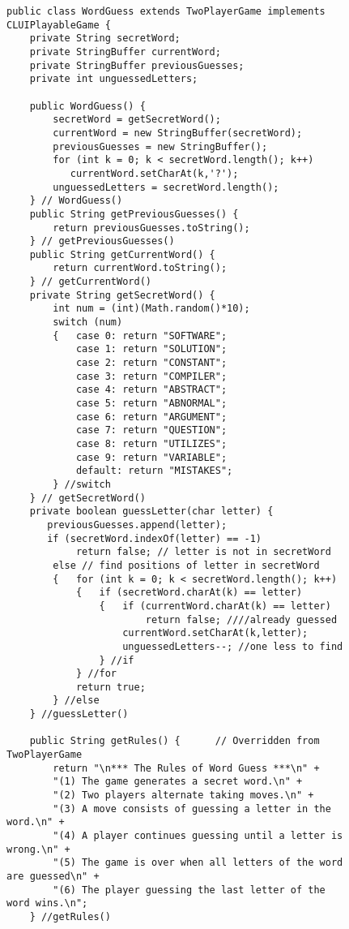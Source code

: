 \begin{figure}[h!!]
\jjjprogstart
\begin{jjjlisting}
\begin{lstlisting}[basicstyle=\scriptsize]
public class WordGuess extends TwoPlayerGame implements CLUIPlayableGame {
    private String secretWord;
    private StringBuffer currentWord;
    private StringBuffer previousGuesses;
    private int unguessedLetters;

    public WordGuess() {   
        secretWord = getSecretWord();
        currentWord = new StringBuffer(secretWord);
        previousGuesses = new StringBuffer();
        for (int k = 0; k < secretWord.length(); k++)
           currentWord.setCharAt(k,'?');
        unguessedLetters = secretWord.length();
    } // WordGuess()
    public String getPreviousGuesses() {
        return previousGuesses.toString();
    } // getPreviousGuesses()
    public String getCurrentWord() {
        return currentWord.toString();
    } // getCurrentWord()
    private String getSecretWord() {   
        int num = (int)(Math.random()*10);
        switch (num)
        {   case 0: return "SOFTWARE";
            case 1: return "SOLUTION";
            case 2: return "CONSTANT";
            case 3: return "COMPILER";
            case 4: return "ABSTRACT";
            case 5: return "ABNORMAL";
            case 6: return "ARGUMENT";
            case 7: return "QUESTION";
            case 8: return "UTILIZES";
            case 9: return "VARIABLE";
            default: return "MISTAKES";
        } //switch
    } // getSecretWord()
    private boolean guessLetter(char letter) {   
       previousGuesses.append(letter);
       if (secretWord.indexOf(letter) == -1)
            return false; // letter is not in secretWord
        else // find positions of letter in secretWord
        {   for (int k = 0; k < secretWord.length(); k++)
            {   if (secretWord.charAt(k) == letter)
                {   if (currentWord.charAt(k) == letter)
                        return false; ////already guessed
                    currentWord.setCharAt(k,letter);
                    unguessedLetters--; //one less to find
                } //if
            } //for
            return true;
        } //else
    } //guessLetter()

    public String getRules() {      // Overridden from TwoPlayerGame
        return "\n*** The Rules of Word Guess ***\n" +
        "(1) The game generates a secret word.\n" +
        "(2) Two players alternate taking moves.\n" +
        "(3) A move consists of guessing a letter in the word.\n" +
        "(4) A player continues guessing until a letter is wrong.\n" +
        "(5) The game is over when all letters of the word are guessed\n" +
        "(6) The player guessing the last letter of the word wins.\n";
    } //getRules()
\end{lstlisting}
\end{jjjlisting}
\end{figure}



